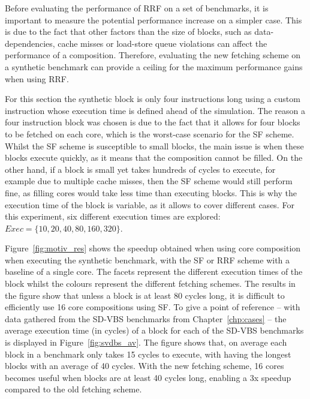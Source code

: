 Before evaluating the performance of RRF on a set of benchmarks, it is important to measure the potential performance increase on a simpler case.
This is due to the fact that other factors than the size of blocks, such as data-dependencies, cache misses or load-store queue violations can affect the performance of a composition.
Therefore, evaluating the new fetching scheme on a synthetic benchmark can provide a ceiling for the maximum performance gains when using RRF.

For this section the synthetic block is only four instructions long using a custom instruction whose execution time is defined ahead of the simulation.
The reason a four instruction block was chosen is due to the fact that it allows for four blocks to be fetched on each core, which is the worst-case scenario for the SF scheme.
Whilst the SF scheme is susceptible to small blocks, the main issue is when these blocks execute quickly, as it means that the composition cannot be filled.
On the other hand, if a block is small yet takes hundreds of cycles to execute, for example due to multiple cache misses, then the SF scheme would still perform fine, as filling cores would take less time than executing blocks.
This is why the execution time of the block is variable, as it allows to cover different cases.
For this experiment, six different execution times are explored: $Exec=\{10,20,40,80,160,320\}$.

Figure~\ref{fig:motiv_res} shows the speedup obtained when using core composition when executing the synthetic benchmark, with the SF or RRF scheme with a baseline of a single core.
The facets represent the different execution times of the block whilst the colours represent the different fetching schemes.
The results in the figure show that unless a block is at least 80 cycles long, it is difficult to efficiently use 16 core compositions using SF.
To give a point of reference -- with data gathered from the SD-VBS benchmarks from Chapter~\ref{chp:cases} -- the average execution time (in cycles) of a block for each of the SD-VBS benchmarks is displayed in Figure~\ref{fig:svdbs_av}.
The figure shows that, on average each block in a benchmark only takes 15 cycles to execute, with  having the longest blocks with an average of 40 cycles.
With the new fetching scheme, 16 cores becomes useful when blocks are at least 40 cycles long, enabling a 3x speedup compared to the old fetching scheme.
